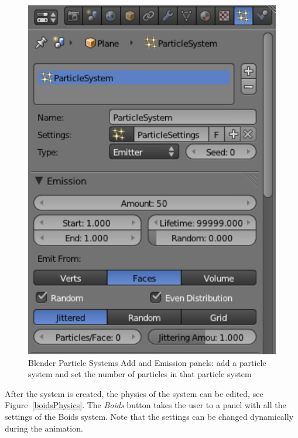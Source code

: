 \begin{figure}[htbp]
\begin{center}
\includegraphics[scale= 0.65]{figures/boidsCreatePS.pdf} 
\caption{Blender Particle Systems Add and Emission panels: add a particle system and set the number of particles in that particle system}
\label{boidsCreatePS}
\end{center}
\end{figure}

After the system is created, the physics of the system can be edited, see Figure~\ref{boidsPhysics}. The \textit{Boids} button takes the user to a panel with all the settings of the Boids system.  Note that the settings can be changed dynamically during the animation. 

